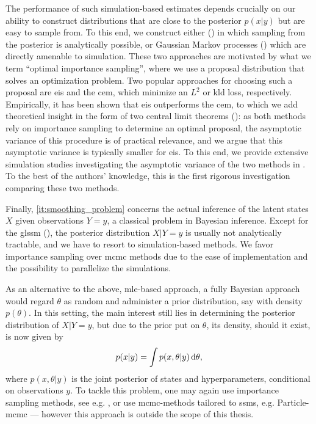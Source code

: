 The performance of such simulation-based estimates depends crucially on our ability to construct distributions that are close to the posterior $p(x|y)$ but are easy to sample from. To this end, we construct either  () in which sampling from the posterior is analytically possible, or Gaussian Markov processes () which are directly amenable to simulation.
These two approaches are motivated by what we term ``{}optimal importance sampling''{}, where we use a proposal distribution that solves an optimization problem. Two popular approaches for choosing such a proposal are \acrlong{eis} and the \acrlong{cem}, which minimize an $L^{2}$ or \gls{kld} loss, respectively. Empirically, it has been shown that \gls{eis} outperforms the \gls{cem}, to which we add theoretical insight in the form of two central limit theorems (): as both methods rely on importance sampling to determine an optimal proposal, the asymptotic variance of this procedure is of practical relevance, and we argue that this asymptotic variance is typically smaller for \gls{eis}.
To this end, we provide extensive simulation studies investigating the asymptotic variance of the two methods in . 
To the best of the authors' knowledge, this is the first rigorous investigation comparing these two methods. 

Finally, \cref{it:smoothing_problem} concerns the actual inference of the latent states $X$ given observations $Y=y$, a classical problem in Bayesian inference. Except for the \gls{glssm} (), the posterior distribution $X|Y=y$ is usually not analytically tractable, and we have to resort to simulation-based methods. We favor importance sampling over \gls{mcmc} methods due to the ease of implementation and the possibility to parallelize the simulations.

As an alternative to the above, \gls{mle}-based approach, a fully Bayesian approach would regard $\theta$ as random and administer a prior distribution, say with density $p(\theta)$. In this setting, the main interest still lies in determining the posterior distribution of $X|Y=y$, but due to the prior put on $\theta$, its density, should it exist, is now given by
$$
p(x|y) = \int p(x,\theta|y) \,\mathrm d \theta,
$$
where $p(x,\theta|y)$ is the joint posterior of states and hyperparameters, conditional on observations $y$. To tackle this problem, one may again use importance sampling methods, see e.g. \citep[Chapter 13.1]{Durbin2012Time}, or use \gls{mcmc}-methods tailored to \glspl{ssm}, e.g. Particle-\gls{mcmc} \citep[Chapter 16]{Chopin2020Introduction} --- however this approach is outside the scope of this thesis.



